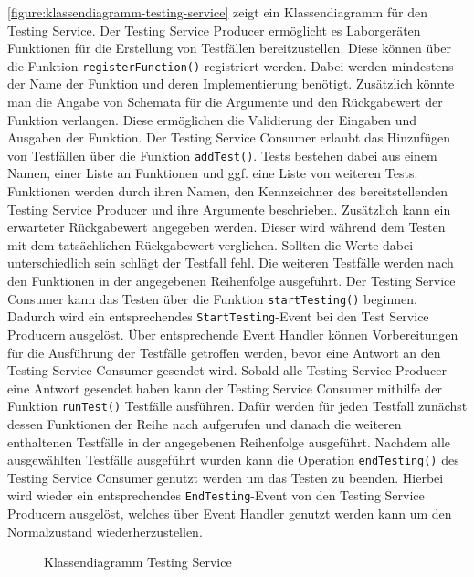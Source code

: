 \autoref{figure:klassendiagramm-testing-service} zeigt ein Klassendiagramm für den Testing Service. Der Testing Service Producer ermöglicht es Laborgeräten Funktionen für die Erstellung von Testfällen bereitzustellen. Diese können über die Funktion \texttt{registerFunction()} registriert werden. Dabei werden mindestens der Name der Funktion und deren Implementierung benötigt. Zusätzlich könnte man die Angabe von Schemata für die Argumente und den Rückgabewert der Funktion verlangen. Diese ermöglichen die Validierung der Eingaben und Ausgaben der Funktion. Der Testing Service Consumer erlaubt das Hinzufügen von Testfällen über die Funktion \texttt{addTest()}. Tests bestehen dabei aus einem Namen, einer Liste an Funktionen und ggf. eine Liste von weiteren Tests. Funktionen werden durch ihren Namen, den Kennzeichner des bereitstellenden Testing Service Producer und ihre Argumente beschrieben. Zusätzlich kann ein erwarteter Rückgabewert angegeben werden. Dieser wird während dem Testen mit dem tatsächlichen Rückgabewert verglichen. Sollten die Werte dabei unterschiedlich sein schlägt der Testfall fehl. Die weiteren Testfälle werden nach den Funktionen in der angegebenen Reihenfolge ausgeführt. Der Testing Service Consumer kann das Testen über die Funktion \texttt{startTesting()} beginnen. Dadurch wird ein entsprechendes \texttt{StartTesting}-Event bei den Test Service Producern ausgelöst. Über entsprechende Event Handler können Vorbereitungen für die Ausführung der Testfälle getroffen werden, bevor eine Antwort an den Testing Service Consumer gesendet wird. Sobald alle Testing Service Producer eine Antwort gesendet haben kann der Testing Service Consumer mithilfe der Funktion \texttt{runTest()} Testfälle ausführen. Dafür werden für jeden Testfall zunächst dessen Funktionen der Reihe nach aufgerufen und danach die weiteren enthaltenen Testfälle in der angegebenen Reihenfolge ausgeführt. Nachdem alle ausgewählten Testfälle ausgeführt wurden kann die Operation \texttt{endTesting()} des Testing Service Consumer genutzt werden um das Testen zu beenden. Hierbei wird wieder ein entsprechendes \texttt{EndTesting}-Event von den Testing Service Producern ausgelöst, welches über Event Handler genutzt werden kann um den Normalzustand wiederherzustellen.

\begin{figure}[tbp]
    \centering
    \caption{Klassendiagramm Testing Service}
    \label{figure:klassendiagramm-testing-service}
\end{figure}

